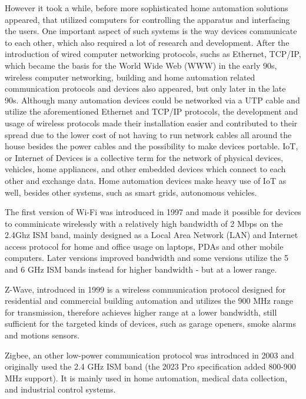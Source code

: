 However it took a while, before more sophisticated home automation solutions appeared, that utilized computers for controlling the apparatus and interfacing the users. One important aspect of such systems is the way devices communicate to each other, which also required a lot of research and development.
After the introduction of wired computer networking protocols, suchs as Ethernet, TCP/IP, which became the basis for the World Wide Web (WWW) in the early 90s, wireless computer networking, building and home automation related communication protocols and devices also appeared, but only later in the late 90s.
Although many automation devices could be networked via a UTP cable and utilize the aforementioned Ethernet and TCP/IP protocols, the development and usage of wireless protocols made their installation easier and contributed to their spread due to the lower cost of not having to run network cables all around the house besides the power cables and the possibility to make devices portable. IoT, or Internet of Devices is a collective term for the network of physical devices, vehicles, home appliances, and other embedded devices which connect to each other and exchange data. \cite{ShafiqIoTAttacks} Home automation devices make heavy use of IoT as well, besides other systems, such as smart grids, autonomous vehicles.

The first version of Wi-Fi was introduced in 1997 and made it possible for devices to comminicate wirelessly with a relatively high bandwidth of 2 Mbps on the 2.4Ghz ISM band, mainly designed as a Local Area Network (LAN) and Internet access protocol for home and office usage on laptops, PDAs and other mobile computers. Later versions improved bandwidth and some versions utilize the 5 and 6 GHz ISM bands instead for higher bandwidth - but at a lower range. \cite{IEEEWiFi}

Z-Wave, introduced in 1999 is a wireless communication protocol designed for residential and commercial building automation and utilizes the 900 MHz range for transmission, therefore achieves higher range at a lower bandwidth, still sufficient for the targeted kinds of devices, such as garage openers, smoke alarms and motions sensors. \cite{PCMagZWave}

Zigbee, an other low-power communication protocol was introduced in 2003 and originally used the 2.4 GHz ISM band (the 2023 Pro specification added 800-900 MHz support). It is mainly used in home automation, medical data collection, and industrial control systems. \cite{DigiZigbee}

